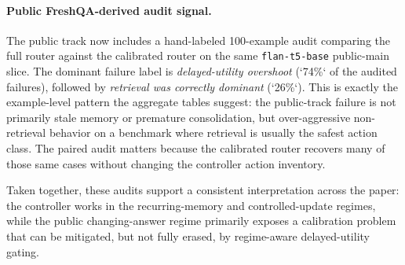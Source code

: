 \paragraph{Public FreshQA-derived audit signal.}
The public track now includes a hand-labeled 100-example audit comparing the full router against the calibrated router on the same \texttt{flan-t5-base} public-main slice. The dominant failure label is \emph{delayed-utility overshoot} (`74\%` of the audited failures), followed by \emph{retrieval was correctly dominant} (`26\%`). This is exactly the example-level pattern the aggregate tables suggest: the public-track failure is not primarily stale memory or premature consolidation, but over-aggressive non-retrieval behavior on a benchmark where retrieval is usually the safest action class. The paired audit matters because the calibrated router recovers many of those same cases without changing the controller action inventory.

Taken together, these audits support a consistent interpretation across the paper: the controller works in the recurring-memory and controlled-update regimes, while the public changing-answer regime primarily exposes a calibration problem that can be mitigated, but not fully erased, by regime-aware delayed-utility gating.
